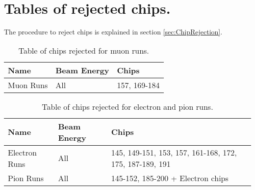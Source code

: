 \chapter{Tables of rejected chips.}
\label{appendix:rejection}

The procedure to reject chips is explained in section \ref{sec:ChipRejection}.

\begin{table}[htb!]
	\centering
	\caption{Table of chips rejected for muon runs.}
	\label{table:rej_muons}
	\begin{tabular}{@{}lll@{}}
		\toprule
		\multicolumn{1}{l}{\textbf{Name}} & \textbf{Beam Energy} & \textbf{Chips}\\
		\midrule
		Muon Runs & All & 157, 169-184\\
		\bottomrule
	\end{tabular}
\end{table}

\begin{table}[htb!]
	\centering
	\caption{Table of chips rejected for electron and pion runs.}
	\label{table:rej_other}
	\begin{tabular}{@{}lll@{}}
		\toprule
		\multicolumn{1}{l}{\textbf{Name}} & \textbf{Beam Energy} & \textbf{Chips}\\
		\midrule
		Electron Runs & All & 145, 149-151, 153, 157, 161-168, 172, 175, 187-189, 191\\
		Pion Runs & All & 145-152, 185-200 + Electron chips\\
		\bottomrule
	\end{tabular}
\end{table}
